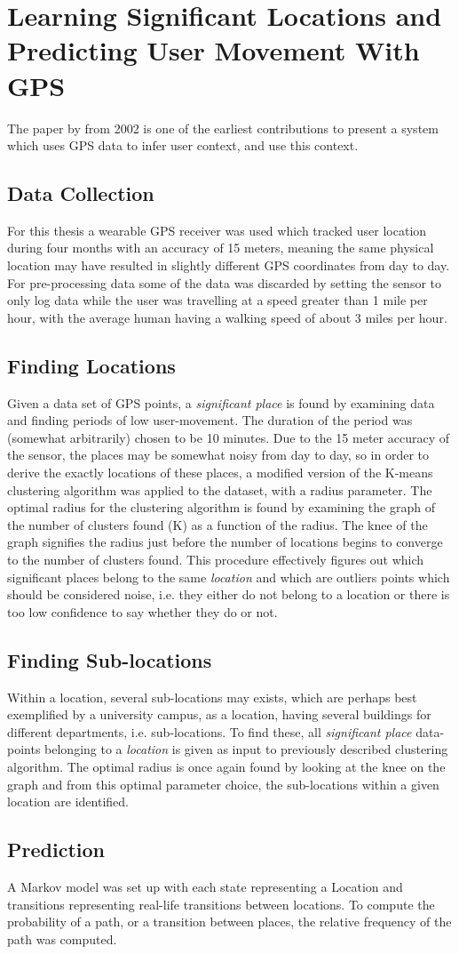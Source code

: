 \section{Learning Significant Locations and Predicting User Movement With GPS}
The paper by \cite{learning_significant_locations} from 2002 is one of the earliest contributions to present a system which uses GPS data to infer user context, and use this context. 

\subsection{Data Collection}
For this thesis a wearable GPS receiver was used which tracked user location during four months with an accuracy of 15 meters, meaning the same physical location may have resulted in slightly different GPS coordinates from day to day. For pre-processing data some of the data was discarded by setting the sensor to only log data while the user was travelling at a speed greater than 1 mile per hour, with the average human having a walking speed of about 3 miles per hour. 

\subsection{Finding Locations}
Given a data set of GPS points, a \textit{significant place} is found by examining data and finding periods of low user-movement. The duration of the period was (somewhat arbitrarily) chosen to be 10 minutes. Due to the 15 meter accuracy of the sensor, the places may be somewhat noisy from day to day, so in order to derive the exactly locations of these places, a modified version of the K-means clustering algorithm was applied to the dataset, with a radius parameter. The optimal radius for the clustering algorithm is found by examining  the graph of the number of clusters found (K) as a function of the radius. The knee of the graph signifies the radius just before the number of locations begins to converge to the number of clusters found. This procedure effectively figures out which significant places belong to the same \textit{location} and which are outliers points which should be considered noise, i.e. they either do not belong to a location or there is too low confidence to say whether they do or not. 

\subsection{Finding Sub-locations}
Within a location, several sub-locations may exists, which are perhaps best exemplified by a university campus, as a location, having several buildings for different departments, i.e. sub-locations. To find these, all \textit{significant place} data-points belonging to a \textit{location} is given as input to previously described clustering algorithm. The optimal radius is once again found by looking at the knee on the graph and from this optimal parameter choice, the sub-locations within a given location are identified.

\subsection{Prediction}
A Markov model was set up with each state representing a Location and transitions representing real-life transitions between locations. To compute the probability of a path, or a transition between places, the relative frequency of the path was computed.

